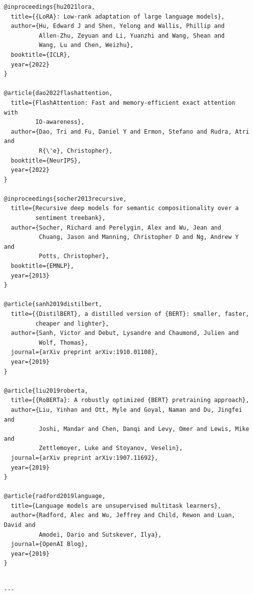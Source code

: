 \begin{lstlisting}
@inproceedings{hu2021lora,
  title={{LoRA}: Low-rank adaptation of large language models},
  author={Hu, Edward J and Shen, Yelong and Wallis, Phillip and 
          Allen-Zhu, Zeyuan and Li, Yuanzhi and Wang, Shean and 
          Wang, Lu and Chen, Weizhu},
  booktitle={ICLR},
  year={2022}
}

@article{dao2022flashattention,
  title={FlashAttention: Fast and memory-efficient exact attention with 
         IO-awareness},
  author={Dao, Tri and Fu, Daniel Y and Ermon, Stefano and Rudra, Atri and 
          R{\'e}, Christopher},
  booktitle={NeurIPS},
  year={2022}
}

@inproceedings{socher2013recursive,
  title={Recursive deep models for semantic compositionality over a 
         sentiment treebank},
  author={Socher, Richard and Perelygin, Alex and Wu, Jean and 
          Chuang, Jason and Manning, Christopher D and Ng, Andrew Y and 
          Potts, Christopher},
  booktitle={EMNLP},
  year={2013}
}

@article{sanh2019distilbert,
  title={{DistilBERT}, a distilled version of {BERT}: smaller, faster, 
         cheaper and lighter},
  author={Sanh, Victor and Debut, Lysandre and Chaumond, Julien and 
          Wolf, Thomas},
  journal={arXiv preprint arXiv:1910.01108},
  year={2019}
}

@article{liu2019roberta,
  title={{RoBERTa}: A robustly optimized {BERT} pretraining approach},
  author={Liu, Yinhan and Ott, Myle and Goyal, Naman and Du, Jingfei and 
          Joshi, Mandar and Chen, Danqi and Levy, Omer and Lewis, Mike and 
          Zettlemoyer, Luke and Stoyanov, Veselin},
  journal={arXiv preprint arXiv:1907.11692},
  year={2019}
}

@article{radford2019language,
  title={Language models are unsupervised multitask learners},
  author={Radford, Alec and Wu, Jeffrey and Child, Rewon and Luan, David and 
          Amodei, Dario and Sutskever, Ilya},
  journal={OpenAI Blog},
  year={2019}
}
\end{lstlisting}
\begin{lstlisting}

---
\end{lstlisting}